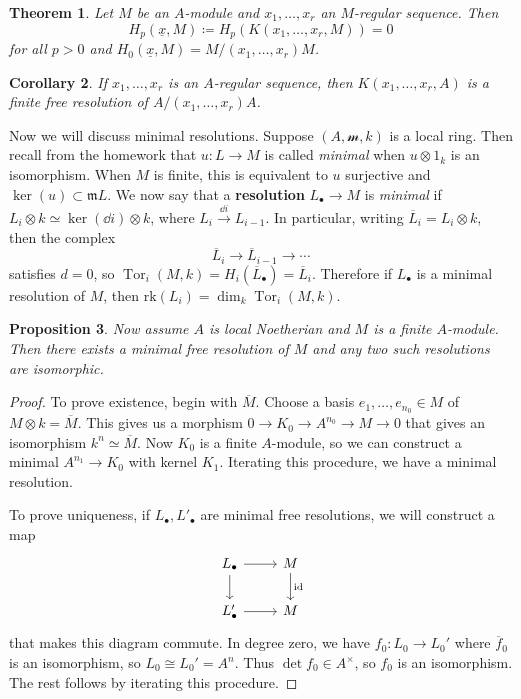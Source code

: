 \documentclass[leqno, openany]{memoir}
\newtheorem{thm}{Theorem}[section]
\newtheorem{cor}[thm]{Corollary}
\newtheorem{prop}[thm]{Proposition}
\theoremstyle{definition}
\theoremstyle{remark}
\theoremstyle{plain}
\theoremstyle{definition}
\theoremstyle{remark}
\newcommand{\mc}[1]{\mathcal{#1}}
\newcommand{\mf}[1]{\mathfrak{#1}}
\newcommand{\mr}[1]{\mathrm{#1}}
\newcommand{\ol}[1]{\overline{#1}}
\newcommand{\ul}[1]{\underline{#1}}
\DeclareMathOperator{\Tor}{Tor}
\begin{document}
\begin{thm}
    Let $M$ be an $A$-module and $x_1, \ldots, x_r$ an $M$-regular sequence. Then 
    \[ H_p(\ul{x}, M) \coloneqq H_p(K(x_1, \ldots, x_r, M)) = 0 \]
    for all $p > 0$ and $H_0(\ul{x}, M) = M/(x_1, \ldots, x_r)M$.
\end{thm}

\begin{cor}
    If $x_1, \ldots, x_r$ is an $A$-regular sequence, then $K(x_1, \ldots, x_r, A)$ is a finite free resolution of $A/(x_1, \ldots, x_r) A$.
\end{cor}

Now we will discuss minimal resolutions. Suppose $(A, \mc{m}, k)$ is a local ring. Then recall from the homework that $u \colon L \to M$ is called \textit{minimal} when $u \otimes 1_k$ is an isomorphism. When $M$ is finite, this is equivalent to $u$ surjective and $\ker(u) \subset \mf{m} L$. We now say that a \textbf{resolution} $L_{\bullet} \to M$ is \textit{minimal} if $L_i \otimes k \simeq \ker (\dd{i}) \otimes k$, where $L_i \xrightarrow{\dd{i}} L_{i-1}$. In particular, writing $\ol{L}_i = L_i \otimes k$, then the complex
\[ \ol{L}_i \to \ol{L}_{i-1} \to \cdots \]
satisfies $d = 0$, so $\Tor_i(M, k) = H_i(\ol{L}_{\bullet}) = \ol{L}_i$. Therefore if $L_{\bullet}$ is a minimal resolution of $M$, then $\mr{rk}(L_i) = \dim_k \Tor_i(M, k)$.

\begin{prop}
    Now assume $A$ is local Noetherian and $M$ is a finite $A$-module. Then there exists a minimal free resolution of $M$ and any two such resolutions are isomorphic.
\end{prop}

\begin{proof}
    To prove existence, begin with $\ol{M}$. Choose a basis $e_1, \ldots, e_{n_0} \in M$ of $M \otimes k = \ol{M}$. This gives us a morphism $0 \to K_0 \to A^{n_0} \to M \to 0$ that gives an isomorphism $k^n \simeq \ol{M}$. Now $K_0$ is a finite $A$-module, so we can construct a minimal $A^{n_1} \to K_0$ with kernel $K_1$. Iterating this procedure, we have a minimal resolution.

    To prove uniqueness, if $L_{\bullet}, L'_{\bullet}$ are minimal free resolutions, we will construct a map
    \begin{equation*}
    \begin{tikzcd}
        L_{\bullet} \arrow{r} \arrow{d} & M \arrow{d}{\mr{id}} \\
        L'_{\bullet} \arrow{r} & M
    \end{tikzcd}
    \end{equation*}
    that makes this diagram commute. In degree zero, we have $f_0 \colon L_0 \to L_0'$ where $\ol{f}_0$ is an isomorphism, so $L_0 \cong L_0' = A^n$. Thus $\det f_0 \in A^{\times}$, so $f_0$ is an isomorphism. The rest follows by iterating this procedure.
\end{proof}
\end{document}
